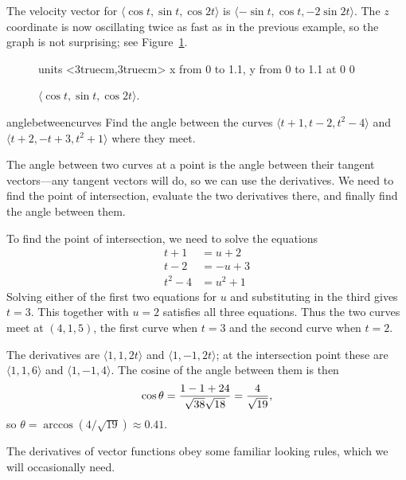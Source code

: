 \begin{example}{}{}
The velocity vector for $\langle \cos t,\sin
t,\cos 2t\rangle$ is $\langle -\sin t,\cos
t,-2\sin 2t\rangle$. The $z$ coordinate is now oscillating twice as
fast as in the previous example, so the graph is not surprising; see
Figure~\ref{fig:roller coaster}.
\end{example}

\begin{figure}[H]
\centerline{
\vbox{\beginpicture
\normalgraphs
\setcoordinatesystem units <3truecm,3truecm>
\setplotarea x from 0 to 1.1, y from 0 to 1.1
 at 0 0
\endpicture}}
\caption{$\langle \cos t,\sin
t,\cos 2t\rangle$. \label{fig:roller coaster}}
\end{figure}

\begin{example}{}{anglebetweencurves}
Find the angle between the curves $\langle t+1,t-2,t^2-4 \rangle$ and 
$\langle t+2,-t+3,t^2+1\rangle$ where they meet.
\end{example}
\begin{solution}
The angle between two curves at a point is the angle between their
tangent vectors---any tangent vectors will do, so we can use the
derivatives. We need to find the point of intersection, evaluate the
two derivatives there, and finally find the angle between them.

To find the point of intersection, we need to solve the equations
\begin{align*}
t+1&=u+2	\\
t-2&=-u+3	\\
t^2-4&=u^2+1
\end{align*}
Solving either of the first two equations for $u$ and substituting in
the third gives $t=3$. This together with
$u=2$ satisfies all three equations. Thus the two curves meet at
$(4,1,5)$, the first curve when $t=3$ and the second curve when
$t=2$.

The derivatives are $\langle 1,1,2t\rangle$ and
$\langle 1,-1,2t\rangle$; at the intersection point these are
$\langle 1,1,6\rangle$ and $\langle 1,-1,4\rangle$. The cosine of the
angle between them is then
$$\cos\theta = {1-1+24\over\sqrt{38}\sqrt{18}}={4\over\sqrt{19}},$$
so $\theta=\arccos(4/\sqrt{19})\approx0.41$.
\end{solution}

The derivatives of vector functions obey some familiar looking rules,
which we will occasionally need.

